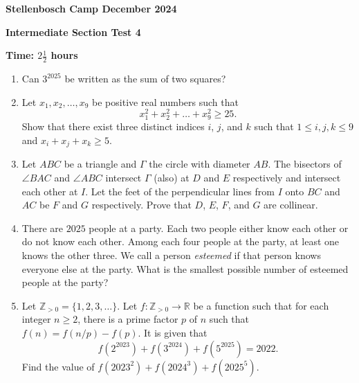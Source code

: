 \documentclass[12pt]{article}
\begin{document}
\begin{center} \large
    \textbf{Stellenbosch Camp December 2024}
    
    \textbf{Intermediate Section Test 4}
    
    \textbf{Time: \(2 \frac{1}{2}\) hours}
\end{center}

\begin{enumerate}[topsep=2\bigskipamount,itemsep=\bigskipamount]
\item Can $3^{2025}$ be written as the sum of two squares?
\item Let $x_1,x_2,\dots,x_9$ be positive real numbers such that
$$x_1^2+x_2^2+\dots + x_9^2\geqslant 25.$$
Show that there exist three distinct indices $i$, $j$, and $k$ such that $1 \leqslant i,j,k \leqslant 9$ and $x_i+x_j+x_k \geqslant 5$.
\item Let $ABC$ be a triangle and $\Gamma$ the circle with diameter $AB$. The bisectors of $\angle{BAC}$ and $\angle{ABC}$ intersect $\Gamma$ (also) at $D$ and $E$ respectively and intersect each other at $I$. Let the feet of the perpendicular lines from $I$ onto $BC$ and $AC$ be $F$ and $G$ respectively. Prove that $D$, $E$, $F$, and $G$ are collinear.
\item There are \(2025\) people at a party. Each two people either know each other or do not know each other. Among each four people at the party, at least one knows the other three. We call a person \emph{esteemed} if that person knows everyone else at the party. What is the smallest possible number of esteemed people at the party?
\item Let \(\mathbb{Z}_{> 0} = \{1, 2, 3, \ldots\}\). Let \(f: \mathbb{Z}_{> 0} \rightarrow \mathbb{R}\) be a function such that for each integer \(n \geqslant 2\), there is a prime factor \(p\) of \(n\) such that \(f(n) = f(n/p) - f(p)\). It is given that
\[f(2^{2023}) + f(3^{2024}) + f(5^{2025}) = 2022.\]
Find the value of \(f(2023^{2}) + f(2024^{3}) + f(2025^{5})\).
\end{enumerate}
\end{document}
